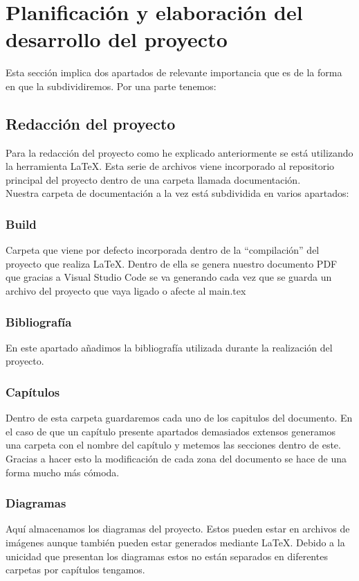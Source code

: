\section{Planificación y elaboración del desarrollo del proyecto}

Esta sección implica dos apartados de relevante importancia que es de la forma en que la subdividiremos. Por una parte tenemos:

\subsection{Redacción del proyecto}

Para la redacción del proyecto como he explicado anteriormente se está utilizando la herramienta LaTeX. Esta serie de archivos viene incorporado al repositorio principal del proyecto dentro de una carpeta llamada documentación.
\\Nuestra carpeta de documentación a la vez está subdividida en varios apartados:

\subsubsection{Build}
Carpeta que viene por defecto incorporada dentro de la ``compilación'' del proyecto que realiza LaTeX. Dentro de ella se genera nuestro documento PDF que gracias a Visual Studio Code se va generando cada vez que se guarda un archivo del proyecto que vaya ligado o afecte al main.tex

\subsubsection{Bibliografía}
En este apartado añadimos la bibliografía utilizada durante la realización del proyecto.

\subsubsection{Capítulos}
Dentro de esta carpeta guardaremos cada uno de los capitulos del documento. En el caso de que un capítulo presente apartados demasiados extensos generamos una carpeta con el nombre del capítulo y metemos las secciones dentro de este. Gracias a hacer esto la modificación de cada zona del documento se hace de una forma mucho más cómoda.

\subsubsection{Diagramas}
Aquí almacenamos los diagramas del proyecto. Estos pueden estar en archivos de imágenes aunque también pueden estar generados mediante LaTeX. Debido a la unicidad que presentan los diagramas estos no están separados en diferentes carpetas por capítulos tengamos.

